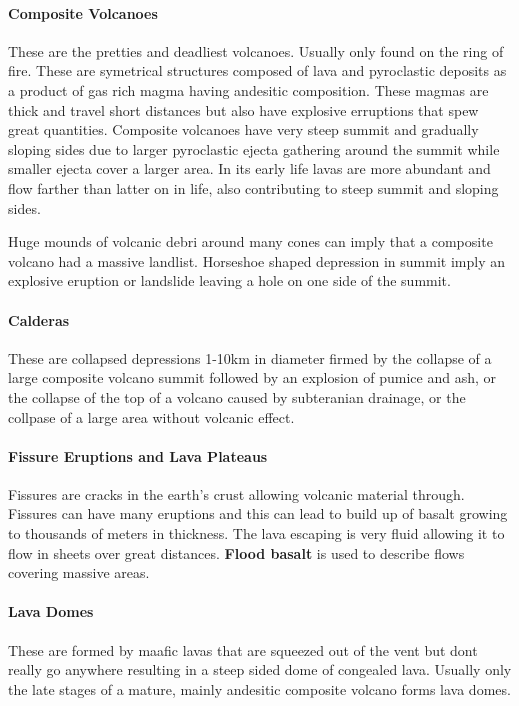 \documentclass{article}
\begin{document}
\paragraph{Composite Volcanoes} %
\label{par:composite_volcanoes}
These are the pretties and deadliest volcanoes. Usually only found on the ring of fire. These are symetrical structures composed of lava and pyroclastic deposits as a product of gas rich magma having andesitic composition. These magmas are thick and travel short distances but also have explosive erruptions that spew great quantities. Composite volcanoes have very steep summit and gradually sloping sides due to larger pyroclastic ejecta gathering around the summit while smaller ejecta cover a larger area. In its early life lavas are more abundant and flow farther than latter on in life, also contributing to steep summit and sloping sides.

Huge mounds of volcanic debri around many cones can imply that a composite volcano had a massive landlist. Horseshoe shaped depression in summit imply an explosive eruption or landslide leaving a hole on one side of the summit.


\paragraph{Calderas} %
\label{par:calderas}
These are collapsed depressions 1-10km in diameter firmed by the collapse of a large composite volcano summit followed by an explosion of pumice and ash, or the collapse of the top of a volcano caused by subteranian drainage, or the collpase of a large area without volcanic effect.

\paragraph{Fissure Eruptions and Lava Plateaus} %
\label{par:fissure_eruptions_and_lava_plateaus}
Fissures are cracks in the earth's crust allowing volcanic material through. Fissures can have many eruptions and this can lead to build up of basalt growing to thousands of meters in thickness. The lava escaping is very fluid allowing it to flow in sheets over great distances. \textbf{Flood basalt} is used to describe flows covering massive areas.

\paragraph{Lava Domes} %
\label{par:lava_domes}
These are formed by maafic lavas that are squeezed out of the vent but dont really go anywhere resulting in a steep sided dome of congealed lava. Usually only the late stages of a mature, mainly andesitic composite volcano forms lava domes.
\end{document}
